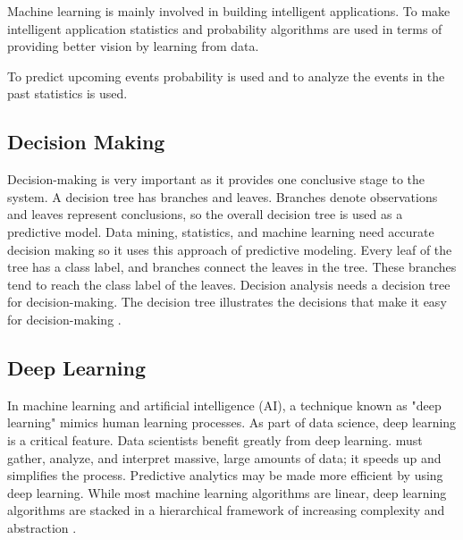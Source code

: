  Machine learning is mainly involved in building intelligent applications. To make intelligent application statistics and probability algorithms are used in terms of providing better vision by learning from data.

To predict upcoming events probability is used and to analyze the events in the past statistics is used.

\subsection{Decision Making}

 Decision-making is very important as it provides one conclusive stage to the system. A decision tree has branches and leaves. Branches denote observations and leaves represent conclusions, so the overall decision tree is used as a predictive model. Data mining, statistics, and machine learning need accurate decision making so it uses this approach of predictive modeling. Every leaf of the tree has a class label, and branches connect the leaves in the tree. These branches tend to reach the class label of the leaves. Decision analysis needs a decision tree for decision-making. The decision tree illustrates the decisions that make it easy for decision-making \cite{XIA20-15}.

 \subsection{Deep Learning}

In machine learning and artificial intelligence (AI), a technique known as "deep learning" mimics human learning processes. As part of data science, deep learning is a critical feature. 
Data scientists benefit greatly from deep learning. must gather, analyze, and interpret massive, large amounts of data; it speeds up and simplifies the process. Predictive analytics may be made more efficient by using deep learning. While most machine learning algorithms are linear, deep learning algorithms are stacked in a hierarchical framework of increasing complexity and abstraction \cite{munppy89-16}.
